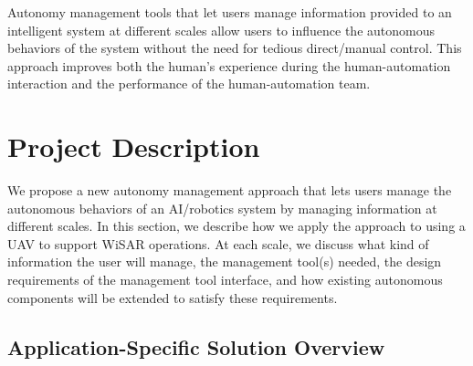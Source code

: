 Autonomy management tools that let users manage information provided to an intelligent system at different scales allow users to influence the autonomous behaviors of the system without the need for tedious direct/manual control. This approach improves both the human's experience during the human-automation interaction and the performance of the human-automation team.

\section{Project Description}
\label{project}


We propose a new autonomy management approach that lets users manage the autonomous behaviors of an AI/robotics system by managing information at different scales. In this section, we describe how we apply the approach to using a UAV to support WiSAR operations. At each scale, we discuss what kind of information the user will manage, the management tool(s) needed, the design requirements of the management tool interface, and how existing autonomous components will be extended to satisfy these requirements.
 
\subsection{Application-Specific Solution Overview}

 
